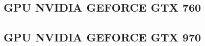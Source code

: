 \subsection{GPU NVIDIA GEFORCE GTX 760}
\label{apend_VdW_760}









\newpage

\subsection{GPU NVIDIA GEFORCE GTX 970}
\label{apend_VdW_970}











